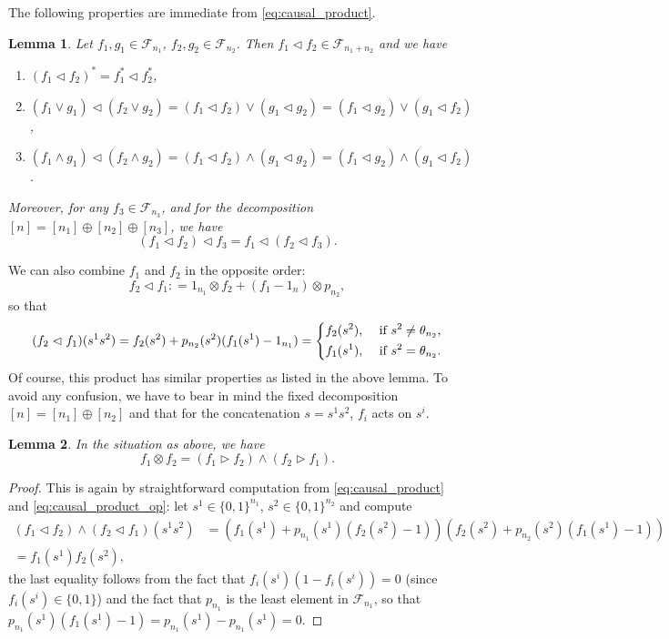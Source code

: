 \documentclass[12pt]{article}
\newtheorem{lemma}{Lemma}
\theoremstyle{definition}
\theoremstyle{remark}
\newtheorem{remark}{Remark}
\def\Fe{\mathcal F}
\def\vtl{\vartriangleleft}
\def\vtr{\vartriangleright}
\begin{document}
%
%
%
The following properties are immediate from \eqref{eq:causal_product}. 

\begin{lemma}\label{lemma:causal_product}
Let $f_1,g_1\in \Fe_{n_1}$, $f_2,g_2\in \Fe_{n_2}$. Then $f_1\vartriangleleft f_2\in \Fe_{n_1+n_2}$ and we
have 
\begin{enumerate}
\item[(i)] $(f_1\vtl f_2)^*=f_1^*\vtl f_2^*$,
\item[(ii)]$(f_1\vee g_1)\vtl (f_2\vee g_2)=(f_1\vtl f_2)\vee ( g_1\vtl g_2)=(f_1\vtl
g_2)\vee (g_1\vtl f_2)$,
\item[(iii)] $(f_1\wedge g_1)\vtl (f_2\wedge g_2)=(f_1\vtl f_2)\wedge ( g_1\vtl g_2)=(f_1\vtl
g_2)\wedge (g_1\vtl f_2)$.
\end{enumerate}
Moreover, for any $f_3\in \Fe_{n_3}$, and for the decomposition $[n]=[n_1]\oplus
[n_2]\oplus [n_3]$, we have 
\[
(f_1\vtl f_2)\vtl f_3=f_1\vtl (f_2\vtl f_3).
\]
\end{lemma}



We can also combine $f_1$ and $f_2$ in the opposite order:
\[
f_2\vtl f_1: =1_{n_1}\otimes f_2+(f_1-1_n)\otimes p_{n_2},
\]
so that
\begin{equation}\label{eq:causal_product_op}
(f_2\vtl f_1)(s^1s^2)=f_2(s^2)+p_{n_2}(s^2)(f_1(s^1)-1_{n_1})=\begin{dcases} f_2(s^2), & \text{ if }
s^2\ne \theta_{n_2},\\
   f_1(s^1), & \text{ if } s^2=\theta_{n_2}.
   \end{dcases}
\end{equation}
Of course, this product has similar properties as listed in the above lemma.
To avoid any confusion, we have to bear in mind the fixed decomposition $[n]=[n_1]\oplus
[n_2]$ and that for the concatenation $s=s^1s^2$, $f_i$ acts on $s^i$. 

\begin{lemma}\label{lemma:causal_tensor} In the situation as above, we have
\[
f_1\otimes f_2 = (f_1\vtr f_2)\wedge (f_2\vtr f_1).
\]

\end{lemma}


\begin{proof} This is again by straightforward computation from \eqref{eq:causal_product}
and \eqref{eq:causal_product_op}: let
$s^1\in \{0,1\}^{n_1}$, $s^2\in \{0,1\}^{n_2}$ and compute
\begin{align*}
(f_1\vtl f_2)\wedge (f_2\vtl
f_1)(s^1s^2)&=\left(f_1(s^1)+p_{n_1}(s^1)(f_2(s^2)-1)\right)\left(f_2(s^2)+p_{n_2}(s^2)(f_1(s^1)-1)\right)\\
=f_1(s^1)f_2(s^2),
\end{align*}
the last equality follows from the fact that $f_i(s^i)(1-f_i(s^i))=0$ (since $f_i(s^i)\in
\{0,1\}$) and the fact that $p_{n_1}$ is the least element in $\Fe_{n_1}$, so that
$p_{n_1}(s^1)(f_1(s^1)-1)=p_{n_1}(s^1)-p_{n_1}(s^1)=0$. 

\end{proof}
\end{document}
